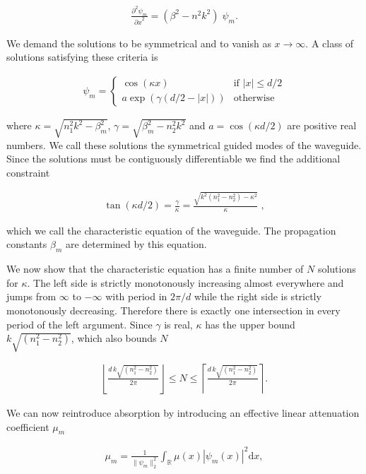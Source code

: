 \begin{align*}
    \frac{\partial^2 \psi_m}{{\partial x}^2} = (\beta^2 - n^2 k^2) \; \psi_m.
\end{align*}

We demand the solutions to be symmetrical and to vanish as $x \rightarrow \infty$. A class of solutions satisfying these criteria is

\begin{align*}
    \psi_m = 
    \begin{cases}
    \cos(\kappa x) & \text{if } |x| \le d/2\\
    a \exp(\gamma (d/2 - |x|)) & \text{otherwise}
    \end{cases}
\end{align*}

where $\kappa = \sqrt{n_1^2 k^2 - \beta_m^2}$, $\gamma = \sqrt{\beta_m^2 - n_2^2 k^2}$ and $a = \cos(\kappa d/2)$ are positive real numbers. We call these solutions the symmetrical guided modes of the waveguide. Since the solutions must be contiguously differentiable we find the additional constraint 

\begin{align*}
\tan(\kappa d/2) = \frac{\gamma}{\kappa} = \frac{ \sqrt{k^2 (n_1^2 - n_2^2) - \kappa^2} }{ \kappa } \; , 
\end{align*}

which we call the characteristic equation of the waveguide. The propagation constants $\beta_m$ are determined by this equation. 

We now show that the characteristic equation has a finite number of $N$ solutions for $\kappa$. The left side is strictly monotonously increasing almost everywhere and jumps from $\infty$ to $-\infty$ with period in $2 \pi / d$ while the right side is strictly monotonously decreasing. Therefore there is exactly one intersection in every period of the left argument. Since $\gamma$ is real, $\kappa$ has the upper bound $k \sqrt{ (n_1^2 - n_2^2)}$, which also bounds $N$

\begin{align*}
   \left\lfloor \frac{ d \, k \sqrt{ (n_1^2 - n_2^2) } }{ 2 \pi } \right\rfloor \le N \le \left\lceil \frac{ d \, k \sqrt{ (n_1^2 - n_2^2) } }{ 2 \pi } \right\rceil.
\end{align*}

We can now reintroduce absorption by introducing an effective linear attenuation coefficient $\mu_m$~\cite{DissertationFuhse}

\begin{align*}
    \mu_m = \frac{1}{\lVert \psi_m \rVert_2^2} \int_\mathbb{R} \mu(x) \left| \psi_m(x) \right|^2 \text{d}x,
\end{align*}

